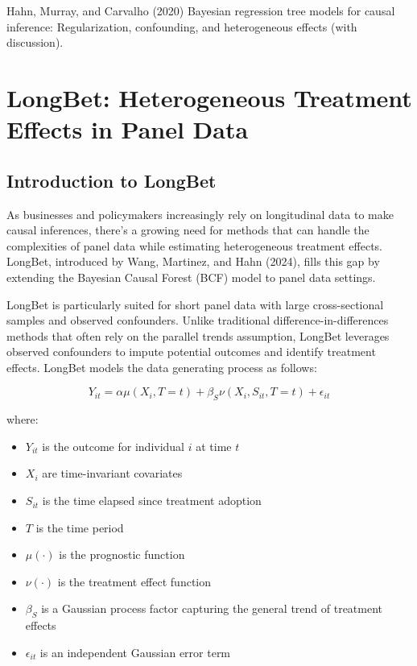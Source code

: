 \documentclass[
  letterpaper,
  DIV=11,
  numbers=noendperiod]{scrreprt}
\providecommand{\tightlist}{%
  \setlength{\itemsep}{0pt}\setlength{\parskip}{0pt}}\usepackage{longtable,booktabs,array}
\begin{document}
\begin{tcolorbox}[enhanced jigsaw, colframe=quarto-callout-tip-color-frame, left=2mm, toprule=.15mm, colbacktitle=quarto-callout-tip-color!10!white, title=\textcolor{quarto-callout-tip-color}{\faLightbulb}\hspace{0.5em}{Learn more}, coltitle=black, rightrule=.15mm, leftrule=.75mm, colback=white, arc=.35mm, bottomtitle=1mm, bottomrule=.15mm, breakable, titlerule=0mm, opacitybacktitle=0.6, toptitle=1mm, opacityback=0]

Hahn, Murray, and Carvalho (2020) Bayesian regression tree models for
causal inference: Regularization, confounding, and heterogeneous effects
(with discussion).

\end{tcolorbox}

\chapter{LongBet: Heterogeneous Treatment Effects in Panel
Data}\label{longbet-heterogeneous-treatment-effects-in-panel-data}

\section{Introduction to LongBet}\label{introduction-to-longbet}

As businesses and policymakers increasingly rely on longitudinal data to
make causal inferences, there's a growing need for methods that can
handle the complexities of panel data while estimating heterogeneous
treatment effects. LongBet, introduced by Wang, Martinez, and Hahn
(2024), fills this gap by extending the Bayesian Causal Forest (BCF)
model to panel data settings.

LongBet is particularly suited for short panel data with large
cross-sectional samples and observed confounders. Unlike traditional
difference-in-differences methods that often rely on the parallel trends
assumption, LongBet leverages observed confounders to impute potential
outcomes and identify treatment effects. LongBet models the data
generating process as follows:

\[
Y_{it} = \alpha\mu(X_i, T=t) + \beta_S\nu(X_i, S_{it}, T=t) + \epsilon_{it}
\]

where:

\begin{itemize}
\tightlist
\item
  \(Y_{it}\) is the outcome for individual \(i\) at time \(t\)
\item
  \(X_i\) are time-invariant covariates
\item
  \(S_{it}\) is the time elapsed since treatment adoption
\item
  \(T\) is the time period
\item
  \(\mu(\cdot)\) is the prognostic function
\item
  \(\nu(\cdot)\) is the treatment effect function
\item
  \(\beta_S\) is a Gaussian process factor capturing the general trend
  of treatment effects
\item
  \(\epsilon_{it}\) is an independent Gaussian error term
\end{itemize}
\end{document}
